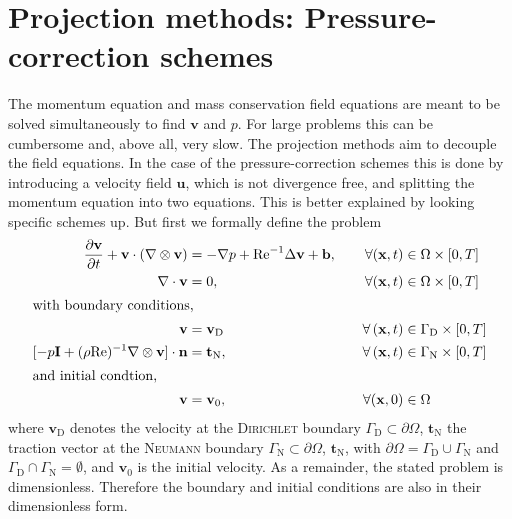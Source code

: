 \documentclass[]{scrartcl}
\newcommand{\pfrac}[2]{\frac{\partial #1}{\partial #2}}
\begin{document}
\section{Projection methods: Pressure-correction schemes}
The momentum equation and mass conservation field equations are meant to be solved simultaneously to find $\mathbf{v}$ and $p$. For large problems this can be cumbersome and, above all, very slow. The projection methods aim to decouple the field equations. In the case of the pressure-correction schemes this is done by introducing a velocity field $\mathbf{u}$, which is not divergence free, and splitting the momentum equation into two equations. This is better explained by looking specific schemes up. But first we formally define the problem
\begin{alignat*}{2}
	\pfrac{\mathbf{v}}{t}  + \mathbf{v}\cdot (\nabla \otimes \mathbf{v}) &=  -\nabla p  +  \mathrm{Re}^{-1} \Delta \mathbf{v} + \mathbf{b}, \quad &\forall (\mathbf{x}, t) &\in \Omega \times \left[0, T \right] \\
	\nabla \cdot \mathbf{v} &= 0, &\forall (\mathbf{x}, t) &\in \Omega \times \left[0, T \right] \\
	\intertext{with boundary conditions,}
	\mathbf{v} &= \mathbf{v}_\textrm{D} &\forall\left(\mathbf{x}, t\right) &\in \Gamma_\textrm{D} \times \left[0, T \right] \\ 
	[-p \mathbf{I} + (\rho\textrm{Re})^{-1}\nabla \otimes \mathbf{v}]\cdot \mathbf{n} &= \mathbf{t}_\textrm{N}, &\forall \left(\mathbf{x}, t\right) &\in \Gamma_\textrm{N} \times \left[0, T \right] \\
	\intertext{and initial condtion,} 
	\mathbf{v} &= \mathbf{v}_0, &\forall (\mathbf{x}, 0) &\in \Omega
\end{alignat*}
where $\mathbf{v}_\textrm{D}$ denotes the velocity at the \textsc{Dirichlet} boundary $\Gamma_\textrm{D}\subset\partial\Omega$, $\mathbf{t}_\textrm{N}$ the traction vector at the \textsc{Neumann} boundary $\Gamma_\textrm{N}\subset\partial\Omega$, $\mathbf{t}_\textrm{N}$, with $\partial \Omega = \Gamma_\textrm{D} \cup \Gamma_\textrm{N}$ and $ \Gamma_\textrm{D} \cap \Gamma_\textrm{N} = \emptyset$, and $\mathbf{v}_0$ is the initial velocity. As a remainder, the stated problem is dimensionless. Therefore the boundary and initial conditions are also in their dimensionless form.
\end{document}
